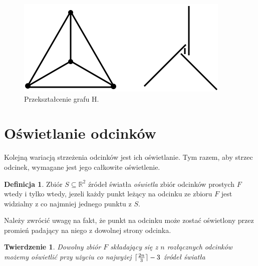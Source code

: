 \documentclass[brudnopis]{xmgr}
\DeclarePairedDelimiter\ceil{\lceil}{\rceil}
\newtheorem{Twierdzenie}{Twierdzenie}
\theoremstyle{definition}
\newtheorem{Definicja}{Definicja}
\begin{document}
\begin{figure}[ht!]
 \centering
  \includegraphics{rysunki/dolna_granica.png}
  \caption{Przekształcenie grafu H.}
  \label{fig:przeksztalcenie h}
\end{figure} 

\section{Oświetlanie odcinków}\label{oświetlanie odcinków}
Kolejną wariacją strzeżenia odcinków jest ich oświetlanie. Tym razem, aby strzec odcinek, wymagane jest jego całkowite oświetlenie.
\begin{Definicja}
	Zbiór $S \subseteq \mathbb{R}^2$ źródeł światła \emph{oświetla} zbiór odcinków prostych $F$ wtedy i tylko wtedy, jezeli każdy punkt leżący na odcinku ze zbioru $F$ jest widzialny z co najmniej jednego punktu z $S$.
\end{Definicja} Należy zwrócić uwagę na fakt, że punkt na odcinku może zostać oświetlony przez promień padający na niego z dowolnej strony odcinka.

\begin{Twierdzenie} \cite{illumination}
 Dowolny zbiór $F$ składający się z $n$ rozłącznych odcinków możemy oświetlić przy użyciu co najwyżej $\ceil{\frac{2n}{3}} - 3$ źródeł światła
\end{Twierdzenie}
\end{document}
